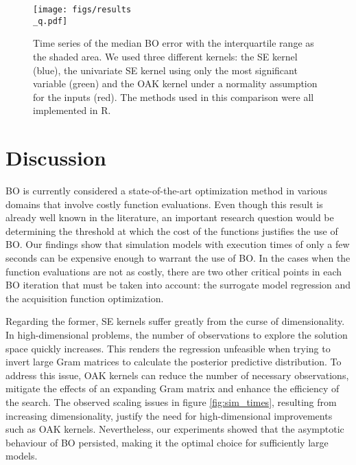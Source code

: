\documentclass{IOS-Book-Article}
\begin{document}
	\begin{figure}[h!]
		\centering	
		\texttt{[image: figs/results\\\_q.pdf]}		
		\caption{Time series of the median BO error with the interquartile range as the shaded area. We used three different kernels: the SE kernel (blue), the univariate SE kernel using only the most significant variable (green) and the OAK kernel under a normality assumption for the inputs (red). The methods used in this comparison were all implemented in R.}
		\label{fig:results_oak}	
	\end{figure}
	
	\section{Discussion}
	BO is currently considered a state-of-the-art optimization method in various domains that involve costly function evaluations. Even though this result is already well known in the literature, an important research question would be determining the threshold at which the cost of the functions justifies the use of BO. Our findings show that simulation models with execution times of only a few seconds can be expensive enough to warrant the use of BO. In the cases when the function evaluations are not as costly, there are two other critical points in each BO iteration that must be taken into account: the surrogate model regression and the acquisition function optimization.
	
	Regarding the former, SE kernels suffer greatly from the curse of dimensionality. In high-dimensional problems, the number of observations to explore the solution space quickly increases. This renders the regression unfeasible when trying to invert large Gram matrices to calculate the posterior predictive distribution. To address this issue, OAK kernels can reduce the number of necessary observations, mitigate the effects of an expanding Gram matrix and enhance the efficiency of the search. The observed scaling issues in figure \ref{fig:sim_times}, resulting from increasing dimensionality, justify the need for high-dimensional improvements such as OAK kernels. Nevertheless, our experiments showed that the asymptotic behaviour of BO persisted, making it the optimal choice for sufficiently large models.
	
\end{document}
